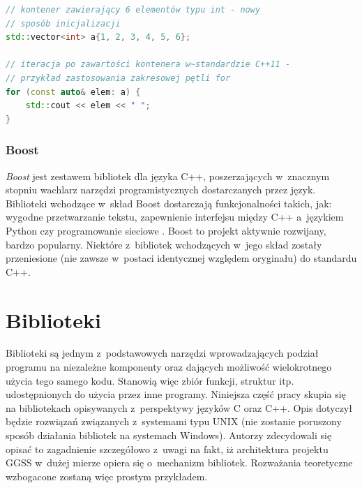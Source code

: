\begin{lstlisting}[language=c++,caption={Przykład kodu w~języku C++ napisany z~wykorzystaniem funkcjonalności ze standardu C++11 (zakresowa pętla for)},label={lst:cpp11}]
// kontener zawierający 6 elementów typu int - nowy
// sposób inicjalizacji
std::vector<int> a{1, 2, 3, 4, 5, 6};

// iteracja po zawartości kontenera w~standardzie C++11 - 
// przykład zastosowania zakresowej pętli for
for (const auto& elem: a) {
	std::cout << elem << " ";
}
\end{lstlisting}


\subsubsection*{Boost}
\textit{Boost} jest zestawem bibliotek dla języka C++, poszerzających w~znacznym stopniu wachlarz narzędzi programistycznych dostarczanych przez język. Biblioteki wchodzące w~skład Boost dostarczają funkcjonalności takich, jak: wygodne przetwarzanie tekstu, zapewnienie interfejsu między C++ a~językiem Python czy programowanie sieciowe \cite{BoostDocs}. Boost to projekt aktywnie rozwijany, bardzo popularny. Niektóre z~bibliotek wchodzących w~jego skład zostały przeniesione (nie zawsze w~postaci identycznej względem oryginału) do standardu C++.

\section{Biblioteki}
\label{section:libs}
Biblioteki są jednym z~podstawowych narzędzi wprowadzających podział programu na niezależne komponenty oraz dających możliwość wielokrotnego użycia tego samego kodu. Stanowią więc zbiór funkcji, struktur itp. udostępnionych do użycia przez inne programy. Niniejsza część pracy skupia się na bibliotekach opisywanych z~perspektywy języków C oraz C++. Opis dotyczył będzie rozwiązań związanych z~systemami typu UNIX (nie zostanie poruszony sposób działania bibliotek na systemach Windows). Autorzy zdecydowali się opisać to zagadnienie szczegółowo z~uwagi na fakt, iż architektura projektu GGSS w~dużej mierze opiera się o~mechanizm bibliotek. Rozważania teoretyczne wzbogacone zostaną więc prostym przykładem.

